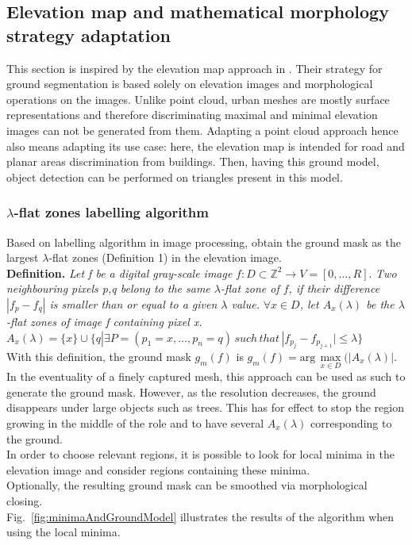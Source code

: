 \documentclass{kththesis}
\begin{document}
\subsection{Elevation map and mathematical morphology strategy adaptation}
\label{sec:elev}
This section is inspired by the elevation map approach in \parencite{det_seg_class, HernandezArtefacts}. Their strategy for ground segmentation is based solely on elevation images and morphological operations on the images. Unlike point cloud, urban meshes are mostly surface representations and therefore discriminating maximal and minimal elevation images can not be generated from them. Adapting a point cloud approach hence also means adapting its use case: here, the elevation map is intended for road and planar areas discrimination from buildings. Then, having this ground model, object detection can be performed on triangles present in this model.  
\subsubsection{$\lambda$-flat zones labelling algorithm}
Based on \textcite{morphoMeyer} labelling algorithm in image processing, \parencite{HernandezArtefacts, det_seg_class} obtain the ground mask as the largest $\lambda$-flat zones (Definition 1) in the elevation image. \\

\textbf{Definition. } \textit{Let f be a digital gray-scale image } $f:D \subset \mathbb{Z}^2 \rightarrow V = [0, \dots, R] $. \textit{Two neighbouring pixels p,q belong to the
same $\lambda$-flat zone of $f$, if their difference
$|f_p - f_q|$ is smaller than or equal to a given $\lambda$ value.} \textit{$\forall x \in D$, let $A_x(\lambda)$ be the $\lambda$-flat zones of image f containing pixel x.} \\
$A_x(\lambda) = \{x\}\cup \{q| \exists P=(p_1=x, \dots, p_n=q) \, such \, that \, |f_{p_j}-f_{p_{j+1}}| \leq \lambda \}$\\

With this definition, the ground mask $g_m(f)$ is $g_m(f) = \text{arg} \, \max \limits_{x \in D}(|A_x(\lambda)|$. \\ 

In the eventuality of a finely captured mesh, this approach can be used as such to generate the ground mask. However, as the resolution decreases, the ground disappears under large objects such as trees. This has for effect to stop the region growing in the middle of the role and to have several $A_x(\lambda)$ corresponding to the ground. \\ 
In order to choose relevant regions, it is possible to look for local minima in the elevation image and  consider regions containing these minima. \\
Optionally, the resulting ground mask can be smoothed via morphological closing. \\
Fig.~\ref{fig:minimaAndGroundModel} illustrates the results of the algorithm when using the local minima. 
\end{document}

